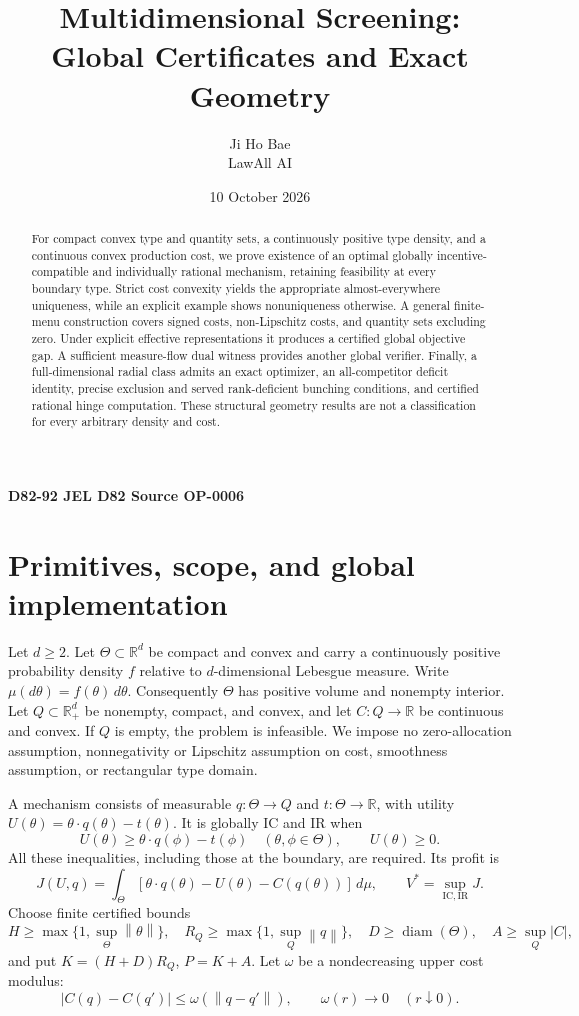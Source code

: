 \documentclass[11pt,a4paper]{article}
\title{Multidimensional Screening:\\Global Certificates and Exact Geometry}
\author{Ji Ho Bae\\\small LawAll AI}
\date{10 October 2026}
\numberwithin{equation}{section}
\newcommand{\R}{\mathbb R}
\newcommand{\norm}[1]{\left\lVert #1\right\rVert}
\DeclareMathOperator{\diam}{diam}
\begin{document}
\maketitle
\begin{center}
\small\textbf{D82-92 \quad JEL D82 \quad Source OP-0006}
\end{center}
\begin{abstract}
For compact convex type and quantity sets, a continuously positive type
density, and a continuous convex production cost, we prove existence of
an optimal globally incentive-compatible and individually rational
mechanism, retaining feasibility at every boundary type. Strict cost
convexity yields the appropriate almost-everywhere uniqueness, while an
explicit example shows nonuniqueness otherwise. A general finite-menu
construction covers signed costs, non-Lipschitz costs, and quantity sets
excluding zero. Under explicit effective representations it produces a
certified global objective gap. A sufficient measure-flow dual witness
provides another global verifier. Finally, a full-dimensional radial
class admits an exact optimizer, an all-competitor deficit identity,
precise exclusion and served rank-deficient bunching conditions, and
certified rational hinge computation. These structural geometry results
are not a classification for every arbitrary density and cost.
\end{abstract}

\section{Primitives, scope, and global implementation}\label{sec:primitives}
Let \(d\ge2\). Let \(\Theta\subset\R^d\) be compact and convex and carry
a continuously positive probability density \(f\) relative to
\(d\)-dimensional Lebesgue measure. Write
\(\mu(d\theta)=f(\theta)\,d\theta\).
Consequently \(\Theta\) has positive volume and nonempty interior.
Let \(Q\subset\R_+^d\) be nonempty, compact, and convex, and let
\(C:Q\to\R\) be continuous and convex.
If \(Q\) is empty, the problem is infeasible.
We impose no zero-allocation assumption, nonnegativity or Lipschitz
assumption on cost, smoothness assumption, or rectangular type domain.

A mechanism consists of measurable \(q:\Theta\to Q\) and
\(t:\Theta\to\R\), with utility
\(U(\theta)=\theta\cdot q(\theta)-t(\theta)\).
It is globally IC and IR when
\[
 U(\theta)\ge\theta\cdot q(\phi)-t(\phi)
 \quad(\theta,\phi\in\Theta),\qquad U(\theta)\ge0.
\]
All these inequalities, including those at the boundary, are required.
Its profit is
\[
 J(U,q)=\int_\Theta[\theta\cdot q(\theta)-U(\theta)-C(q(\theta))]\,d\mu,
 \qquad V^*=\sup_{\mathrm{IC,IR}}J.
\]
Choose finite certified bounds
\[
 H\ge\max\{1,\sup_\Theta\norm\theta\},\quad
 R_Q\ge\max\{1,\sup_Q\norm q\},\quad
 D\ge\diam(\Theta),\quad A\ge\sup_Q|C|,
\]
and put \(K=(H+D)R_Q\), \(P=K+A\).
Let \(\omega\) be a nondecreasing upper cost modulus:
\[
 |C(q)-C(q')|\le\omega(\norm{q-q'}),\qquad
 \omega(r)\longrightarrow0\quad(r\downarrow0).
\]
\end{document}

